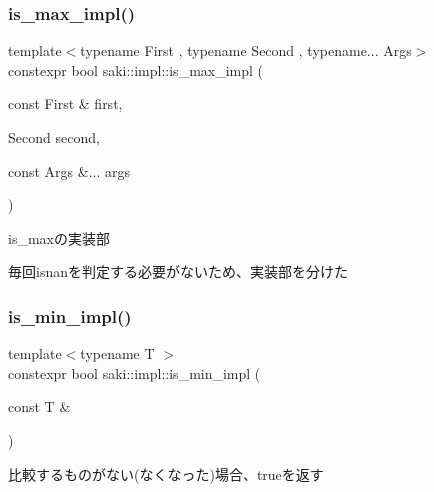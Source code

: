 \subsubsection{\texorpdfstring{is\+\_\+max\+\_\+impl()}{is\_max\_impl()}\hspace{0.1cm}{\footnotesize\ttfamily [2/2]}}
{\footnotesize\ttfamily template$<$typename First , typename Second , typename... Args$>$ \\
constexpr bool saki\+::impl\+::is\+\_\+max\+\_\+impl (\begin{DoxyParamCaption}\item[{const First \&}]{first,  }\item[{Second}]{second,  }\item[{const Args \&...}]{args }\end{DoxyParamCaption})}



is\+\_\+maxの実装部 

毎回isnanを判定する必要がないため、実装部を分けた \mbox{\label{namespacesaki_1_1impl_ac84f4d7f2170d7090fc5e9fb79c21b7f}} 
\subsubsection{\texorpdfstring{is\+\_\+min\+\_\+impl()}{is\_min\_impl()}\hspace{0.1cm}{\footnotesize\ttfamily [1/2]}}
{\footnotesize\ttfamily template$<$typename T $>$ \\
constexpr bool saki\+::impl\+::is\+\_\+min\+\_\+impl (\begin{DoxyParamCaption}\item[{const T \&}]{ }\end{DoxyParamCaption})}



比較するものがない(なくなった)場合、trueを返す 

\mbox{\label{namespacesaki_1_1impl_ad6976cd10062dbcffec09620629f16bd}} 
